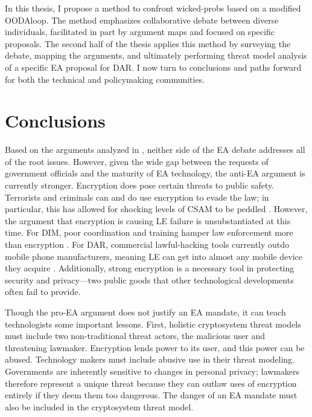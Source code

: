 In this thesis, I propose a method to confront \acp{wicked-prob} based on a modified \ac{OODAloop}. The method
emphasizes collaborative debate between diverse individuals, facilitated in part by argument maps and focused on
specific proposals. The second half of the thesis applies this method by surveying the debate, mapping the arguments,
and ultimately performing threat model analysis of a specific \ac{EA} proposal for \acl{DAR}. I now turn to conclusions
and paths forward for both the technical and policymaking communities.


\section{Conclusions}

Based on the arguments analyzed in , neither side of the \ac{EA} debate addresses all of the root
issues. However, given the wide gap between the requests of government officials and the maturity of \ac{EA} technology,
the anti-\ac{EA} argument is currently stronger. Encryption does pose certain threats to public safety. Terrorists and
criminals can and do use encryption to evade the law; in particular, this has allowed for shocking levels of \acf{CSAM}
to be peddled \cite{keller_internet_2019}. However, the argument that \ac{encryption} is causing \acl{LE} failure is
unsubstantiated at this time. For \acl{DIM}, poor coordination and training hamper law enforcement more than encryption
\cite{carter_2018}. For \acl{DAR}, commercial \ac{lawful-hacking} tools currently outdo mobile phone manufacturers,
meaning \acl{LE} can get into almost any mobile device they acquire \cite{koepke_2020}. Additionally, strong
\ac{encryption} is a necessary tool in protecting security and privacy---two public goods that other technological
developments often fail to provide.

Though the pro-\ac{EA} argument does not justify an \ac{EA} mandate, it can teach technologists some important lessons.
First, holistic cryptosystem threat models must include two non-traditional threat actors, the malicious user and
threatening lawmaker. Encryption lends power to its user, and this power can be abused. Technology makers must include
abusive use in their threat modeling. Governments are inherently sensitive to changes in personal privacy; lawmakers
therefore represent a unique threat because they can outlaw uses of encryption entirely if they deem them too dangerous.
The danger of an \ac{EA} mandate must also be included in the cryptosystem threat model.

